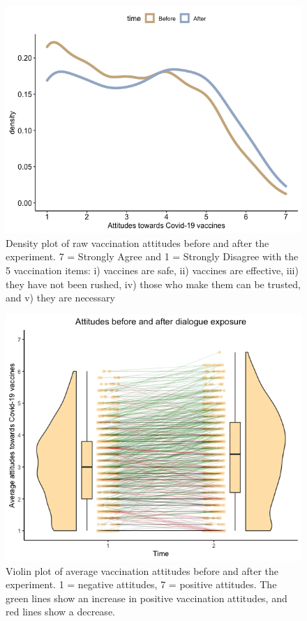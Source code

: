 \documentclass[
  english,
  ,jou,floatsintext]{apa6}
\begin{document}
\begin{figure}

{\centering \includegraphics[width=1\linewidth]{../plots/raw_density} 

}

\caption{Density plot of raw vaccination attitudes before and after the experiment. 7 = Strongly Agree and 1 = Strongly Disagree with the 5 vaccination items: i) vaccines are safe, ii) vaccines are effective, iii) they have not been rushed, iv) those who make them can be trusted, and v) they are necessary}\label{fig:rawdensity}
\end{figure}

\begin{figure}

{\centering \includegraphics[width=1\linewidth]{../plots/before_and_after_violin2} 

}

\caption{Violin plot of average vaccination attitudes before and after the experiment. 1 = negative attitudes, 7 = positive attitudes. The green lines show an increase in positive vaccination attitudes, and red lines show a decrease.}\label{fig:beforeafter}
\end{figure}
\end{document}
